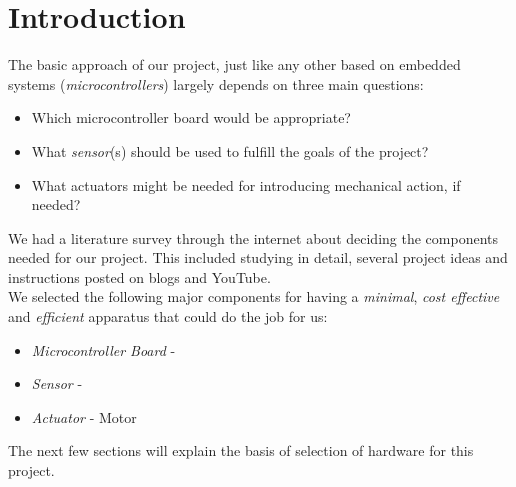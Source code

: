 \chapter{Introduction}\label{ch:introduction}
The basic approach of our project, just like any other based on embedded systems (\textit{microcontrollers}) largely depends on three main questions: 
\begin{itemize}
	\item Which microcontroller board would be appropriate?
	\item What \textit{sensor}(s) should be used to fulfill the goals of the project? 
	\item What actuators might be needed for introducing mechanical action, if needed? 
 
\end{itemize}

We had a literature survey through the internet about deciding the components needed for our project. This included studying in detail, several project ideas and instructions posted on blogs and YouTube.\\
We selected the following major components for having a \textsl{minimal}, \textsl{cost effective} and \textsl{efficient} apparatus that could do the job for us:
\begin{itemize}
	\item \textit{Microcontroller Board} - \arduinouno{}
	\item \textit{Sensor} - \hcsr{} \ultrasonic{}
	\item \textit{Actuator} - \servo{} Motor

\end{itemize}
The next few sections will explain the basis of selection of hardware for this project.

\clearpage

